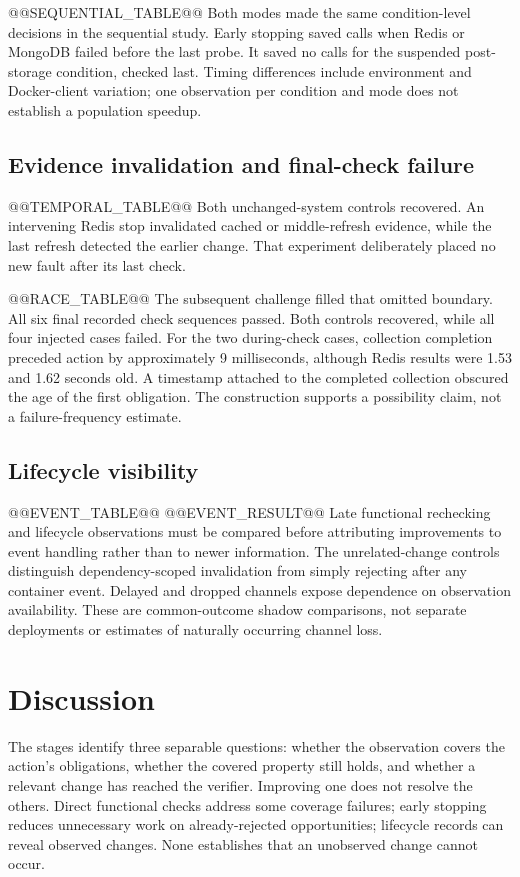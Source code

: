 \documentclass[11pt]{article}
\begin{document}
@@SEQUENTIAL_TABLE@@
Both modes made the same condition-level decisions in the sequential study. Early stopping saved calls when Redis or MongoDB failed before the last probe. It saved no calls for the suspended post-storage condition, checked last. Timing differences include environment and Docker-client variation; one observation per condition and mode does not establish a population speedup.

\subsection{Evidence invalidation and final-check failure}
@@TEMPORAL_TABLE@@
Both unchanged-system controls recovered. An intervening Redis stop invalidated cached or middle-refresh evidence, while the last refresh detected the earlier change. That experiment deliberately placed no new fault after its last check.

@@RACE_TABLE@@
The subsequent challenge filled that omitted boundary. All six final recorded check sequences passed. Both controls recovered, while all four injected cases failed. For the two during-check cases, collection completion preceded action by approximately 9 milliseconds, although Redis results were 1.53 and 1.62 seconds old. A timestamp attached to the completed collection obscured the age of the first obligation. The construction supports a possibility claim, not a failure-frequency estimate.

\subsection{Lifecycle visibility}
@@EVENT_TABLE@@
@@EVENT_RESULT@@
Late functional rechecking and lifecycle observations must be compared before attributing improvements to event handling rather than to newer information. The unrelated-change controls distinguish dependency-scoped invalidation from simply rejecting after any container event. Delayed and dropped channels expose dependence on observation availability. These are common-outcome shadow comparisons, not separate deployments or estimates of naturally occurring channel loss.

\section{Discussion}
The stages identify three separable questions: whether the observation covers the action's obligations, whether the covered property still holds, and whether a relevant change has reached the verifier. Improving one does not resolve the others. Direct functional checks address some coverage failures; early stopping reduces unnecessary work on already-rejected opportunities; lifecycle records can reveal observed changes. None establishes that an unobserved change cannot occur.
\end{document}
